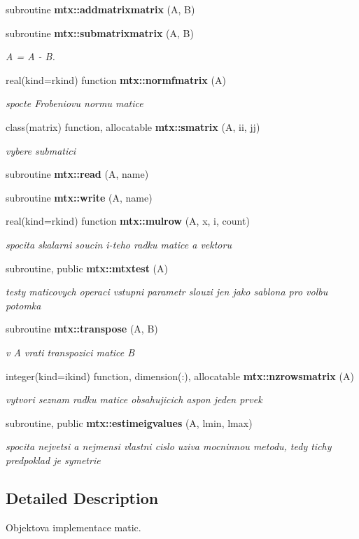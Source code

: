 \begin{DoxyCompactItemize}
subroutine {\bf mtx\+::addmatrixmatrix} (A, B)
\item 
subroutine {\bf mtx\+::submatrixmatrix} (A, B)
\begin{DoxyCompactList}\small\item\em A = A -\/ B. \end{DoxyCompactList}\item 
real(kind=rkind) function {\bf mtx\+::normfmatrix} (A)
\begin{DoxyCompactList}\small\item\em spocte Frobeniovu normu matice \end{DoxyCompactList}\item 
class(matrix) function, allocatable {\bf mtx\+::smatrix} (A, ii, jj)
\begin{DoxyCompactList}\small\item\em vybere submatici \end{DoxyCompactList}\item 
subroutine {\bf mtx\+::read} (A, name)
\item 
subroutine {\bf mtx\+::write} (A, name)
\item 
real(kind=rkind) function {\bf mtx\+::mulrow} (A, x, i, count)
\begin{DoxyCompactList}\small\item\em spocita skalarni soucin i-\/teho radku matice a vektoru \end{DoxyCompactList}\item 
subroutine, public {\bf mtx\+::mtxtest} (A)
\begin{DoxyCompactList}\small\item\em testy maticovych operaci vstupni parametr slouzi jen jako sablona pro volbu potomka \end{DoxyCompactList}\item 
subroutine {\bf mtx\+::transpose} (A, B)
\begin{DoxyCompactList}\small\item\em v A vrati transpozici matice B \end{DoxyCompactList}\item 
integer(kind=ikind) function, dimension(\+:), allocatable {\bf mtx\+::nzrowsmatrix} (A)
\begin{DoxyCompactList}\small\item\em vytvori seznam radku matice obsahujicich aspon jeden prvek \end{DoxyCompactList}\item 
subroutine, public {\bf mtx\+::estimeigvalues} (A, lmin, lmax)
\begin{DoxyCompactList}\small\item\em spocita nejvetsi a nejmensi vlastni cislo uziva mocninnou metodu, tedy tichy predpoklad je symetrie \end{DoxyCompactList}\end{DoxyCompactItemize}


\subsection{Detailed Description}
Objektova implementace matic. 

